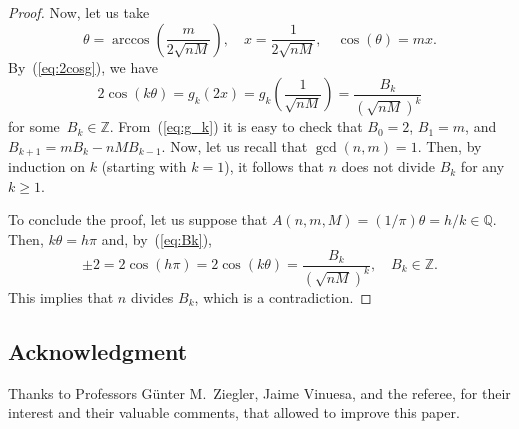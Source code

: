 \documentclass[10pt,a4paper]{article}
\newcommand{\Q}{\mathbb{Q}}
\newcommand{\Z}{\mathbb{Z}}
\theoremstyle{remark}
\begin{document}
\begin{proof}
Now, let us take
$$
  \theta = \arccos\left(\frac{m}{2\sqrt{nM}}\right),
  \quad x = \frac{1}{2\sqrt{nM}},
  \quad \cos(\theta) = mx.
$$
By~(\ref{eq:2cosg}), we have
\begin{equation}
\label{eq:Bk}
  2 \cos(k \theta) = g_k(2x) = g_k\left(\frac{1}{\sqrt{nM}}\right)
  = \frac{B_k}{(\sqrt{nM})^k}
\end{equation}
for some~$B_k \in \Z$. From~(\ref{eq:g_k}) it is easy to check that
$B_0 = 2$, $B_1 = m$, and $B_{k+1} = m B_k - nM B_{k-1}$.
Now, let us recall that $\gcd(n,m) = 1$. Then, by induction on $k$ (starting with $k=1$),
it follows that $n$ does not divide $B_k$ for any $k \ge 1$.

To conclude the proof, let us suppose that $A(n,m,M) = (1/\pi) \theta = h/k \in \Q$.
Then, $k\theta = h\pi$ and, by~(\ref{eq:Bk}),
$$
  \pm 2 = 2 \cos(h\pi) = 2 \cos(k\theta) = \frac{B_k}{(\sqrt{nM})^k},
  \quad B_k \in \Z.
$$
This implies that $n$ divides $B_k$, which is a contradiction.
\end{proof}

\subsection*{Acknowledgment} Thanks to Professors G\"unter M.~Ziegler,
Jai\-me Vi\-nue\-sa, and the referee, for their
interest and their valuable comments, that allowed to improve this paper.
\end{document}
